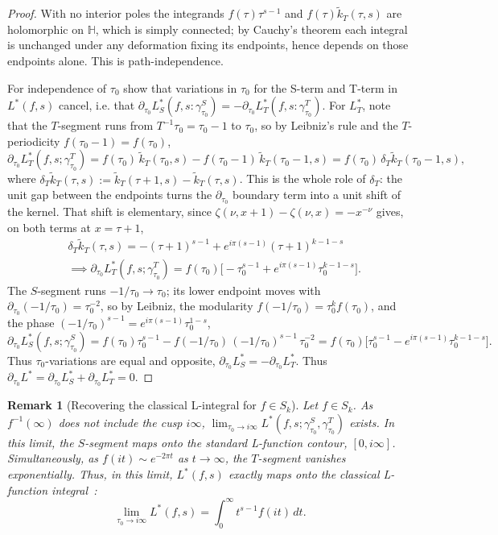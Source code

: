 \documentclass[11pt]{article}
\newtheorem{remark}[theorem]{Remark}
\newcommand{\HH}{\mathbb{H}}
\newcommand{\tk}{\widetilde{k}_T}
\begin{document}
\begin{proof}
With no interior poles the integrands $f(\tau)\tau^{s-1}$ and $f(\tau)\tk(\tau,s)$ are
holomorphic on $\HH$, which is simply connected; by Cauchy's theorem each integral is unchanged
under any deformation fixing its endpoints, hence depends on those endpoints alone. This is
path-independence.

For independence of $\tau_0$ show that variations in $\tau_0$ for the S-term and T-term in $L^*(f,s)$ 
cancel, i.e. that $\partial_{\tau_0} L^*_S(f,s:\gamma^S_{\tau_0}) = -\partial_{\tau_0} L^*_T(f,s:\gamma^T_{\tau_0})$. 
For $L^*_T$, note that the $T$-segment runs from $T^{-1}\tau_0=\tau_0-1$ to $\tau_0$, 
so by Leibniz's rule and the $T$-periodicity $f(\tau_0-1)=f(\tau_0)$,
\begin{equation}
\partial_{\tau_0} L^*_T(f, s; \gamma^T_{\tau_0})
=f(\tau_0)\,\tk(\tau_0,s)-f(\tau_0-1)\,\tk(\tau_0-1,s)
=f(\tau_0)\,\delta_T\tk(\tau_0-1,s),
\end{equation}
where $\delta_T\tk(\tau,s):=\tk(\tau+1,s)-\tk(\tau,s)$. This is the whole role of $\delta_T$: the
unit gap between the endpoints turns the $\partial_{\tau_0}$ boundary term into a unit shift of
the kernel. That shift is elementary, since $\zeta(\nu,x+1)-\zeta(\nu,x)=-x^{-\nu}$ gives, on 
both terms at $x=\tau+1$,
\begin{align}
& \delta_T\tk(\tau,s)=-(\tau+1)^{s-1}+e^{i\pi(s-1)}(\tau+1)^{k-1-s}
\\
& \implies \partial_{\tau_0} L^*_T(f, s; \gamma^T_{\tau_0}) =f(\tau_0)\big[-\tau_0^{s-1}+e^{i\pi(s-1)}\tau_0^{k-1-s}\big].
\end{align}
The $S$-segment runs $-1/\tau_0\to\tau_0$; its lower endpoint moves with
$\partial_{\tau_0}(-1/\tau_0)=\tau_0^{-2}$, so by Leibniz, the modularity
$f(-1/\tau_0)=\tau_0^k f(\tau_0)$, and the phase $(-1/\tau_0)^{s-1}=e^{i\pi(s-1)}\tau_0^{1-s}$,
\begin{equation}
\partial_{\tau_0} L^*_S(f, s; \gamma^S_{\tau_0}) 
=f(\tau_0)\tau_0^{s-1}-f(-1/\tau_0)\,(-1/\tau_0)^{s-1}\,\tau_0^{-2}
=f(\tau_0)\big[\tau_0^{s-1}-e^{i\pi(s-1)}\tau_0^{k-1-s}\big].
\end{equation}
Thus $\tau_0$-variations are equal and opposite, $\partial_{\tau_0}L^*_S = - \partial_{\tau_0}L^*_T$. Thus 
$\partial_{\tau_0}L^*=\partial_{\tau_0}L^*_S + \partial_{\tau_0}L^*_T=0$.
\end{proof}

\begin{remark}[Recovering the classical L-integral for $f \in S_k$]\label{rem:mellin}
\emph{Let $f\in S_k$. As $f^{-1}(\infty)$ does not include the cusp $i \infty$, 
$\lim_{\tau_0 \to i \infty} L^*(f, s; \gamma^S_{\tau_0}, \gamma^T_{\tau_0})$ exists. 
In this limit, the $S$-segment maps onto the standard 
L-function contour, $[0,i\infty]$. Simultaneously, as $f(it) \sim e^{-2\pi t}$ as 
$t \to \infty$, the $T$-segment vanishes exponentially. Thus, in this limit, $L^*(f,s)$ 
exactly maps onto the classical L-function integral~\cite{01-Apostol}:}
\begin{equation}
\lim_{\tau_0\to i\infty}L^*(f,s)=\int_0^{\infty}\! t^{s-1}f(it)\,dt.
\end{equation}
\end{remark}
\end{document}
